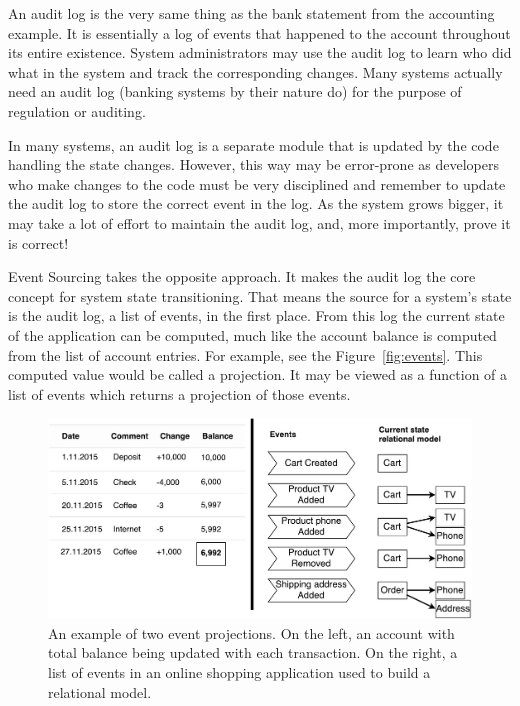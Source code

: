 \documentclass{book}
\begin{document}
An audit log is the very same thing as the bank statement from the
accounting example. It is essentially a log of events that happened to
the account throughout its entire existence. System administrators may
use the audit log to learn who did what in the system and track the
corresponding changes. Many systems actually need an audit log (banking
systems by their nature do) for the purpose of regulation or auditing.

In many systems, an audit log is a separate module that is updated by
the code handling the state changes. However, this way may be
error-prone as developers who make changes to the code must be very
disciplined and remember to update the audit log to store the correct
event in the log. As the system grows bigger, it may take a lot of
effort to maintain the audit log, and, more importantly, prove it is
correct!

Event Sourcing takes the opposite approach. It makes the audit log the
core concept for system state transitioning. That means the source for a
system's state is the audit log, a list of events, in the first place.
From this log the current state of the application can be computed, much
like the account balance is computed from the list of account entries.
For example, see the Figure~\ref{fig:events}. This computed value would
be called a projection. It may be viewed as a function of a list of
events which returns a projection of those events.


\begin{figure}[h!]
\begin{center}
\includegraphics[width=1\columnwidth]{figures/events/events}
\caption[An example of two event projections]{An example of two event projections. On the left, an account
with total balance being updated with each transaction. On the right,
a list of events in an online shopping application used to build
a relational model.%
}
\end{center}
\end{figure}
\end{document}

